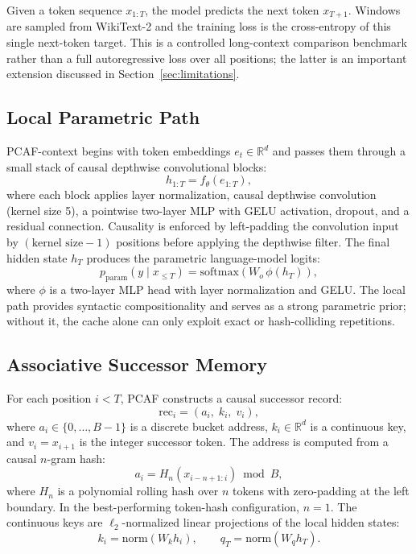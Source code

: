 \documentclass{article}
\begin{document}
Given a token sequence $x_{1:T}$, the model predicts the next token
$x_{T+1}$. Windows are sampled from WikiText-2 and the training loss is the
cross-entropy of this single next-token target. This is a controlled
long-context comparison benchmark rather than a full autoregressive loss over
all positions; the latter is an important extension discussed in
Section~\ref{sec:limitations}.

\subsection{Local Parametric Path}

PCAF-context begins with token embeddings $e_t \in \mathbb{R}^d$ and passes
them through a small stack of causal depthwise convolutional blocks:
\begin{equation}
  h_{1:T} = f_{\theta}(e_{1:T}),
\end{equation}
where each block applies layer normalization, causal depthwise convolution
(kernel size 5), a pointwise two-layer MLP with GELU activation, dropout, and a
residual connection. Causality is enforced by left-padding the convolution
input by $(\text{kernel size} - 1)$ positions before applying the depthwise
filter. The final hidden state $h_T$ produces the parametric language-model
logits:
\begin{equation}
  p_{\mathrm{param}}(y \mid x_{\leq T}) =
  \mathrm{softmax}(W_o \, \phi(h_T)),
\end{equation}
where $\phi$ is a two-layer MLP head with layer normalization and GELU.
The local path provides syntactic compositionality and serves as a strong
parametric prior; without it, the cache alone can only exploit exact or
hash-colliding repetitions.

\subsection{Associative Successor Memory}

For each position $i < T$, PCAF constructs a causal successor record:
\begin{equation}
  \mathrm{rec}_i = (a_i,\; k_i,\; v_i),
\end{equation}
where $a_i \in \{0,\ldots,B-1\}$ is a discrete bucket address,
$k_i \in \mathbb{R}^d$ is a continuous key, and $v_i = x_{i+1}$ is the integer
successor token. The address is computed from a causal $n$-gram hash:
\begin{equation}
  a_i = H_n(x_{i-n+1:i}) \bmod B,
\end{equation}
where $H_n$ is a polynomial rolling hash over $n$ tokens with zero-padding at
the left boundary. In the best-performing token-hash configuration, $n=1$. The
continuous keys are $\ell_2$-normalized linear projections of the local hidden
states:
\begin{equation}
  k_i = \mathrm{norm}(W_k h_i), \qquad q_T = \mathrm{norm}(W_q h_T).
\end{equation}
\end{document}
